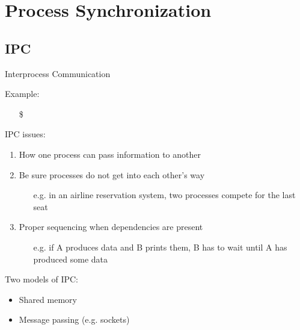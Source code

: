 \begin{frame}
  \begin{refsection}
    \nocite{wiki:process, wiki:thread, wiki:pcb}
    \printbibliography[heading=none]
  \end{refsection}
\end{frame}


\section{Process Synchronization}
\label{sec:proc-synchr}

\subsection{IPC}
\label{sec:ipc}

\begin{frame}{Interprocess Communication}
  \begin{block}{Example:}
    \begin{itemize}
    \item[\$] 
    \end{itemize}
  \end{block}
  \begin{block}{IPC issues:}
    \begin{enumerate}
    \item How one process can pass information to another
    \item Be sure processes do not get into each other's way
      \begin{itemize}
      \item[e.g.] in an airline reservation system, two processes compete for the last
        seat
      \end{itemize}
    \item Proper sequencing when dependencies are present
      \begin{itemize}
      \item[e.g.] if A produces data and B prints them, B has to wait until A has produced
        some data
      \end{itemize}
    \end{enumerate}
  \end{block}
  \begin{block}{Two models of IPC:}
    \begin{itemize}
    \item Shared memory
    \item Message passing (e.g. sockets)
    \end{itemize}
  \end{block}
\end{frame}

